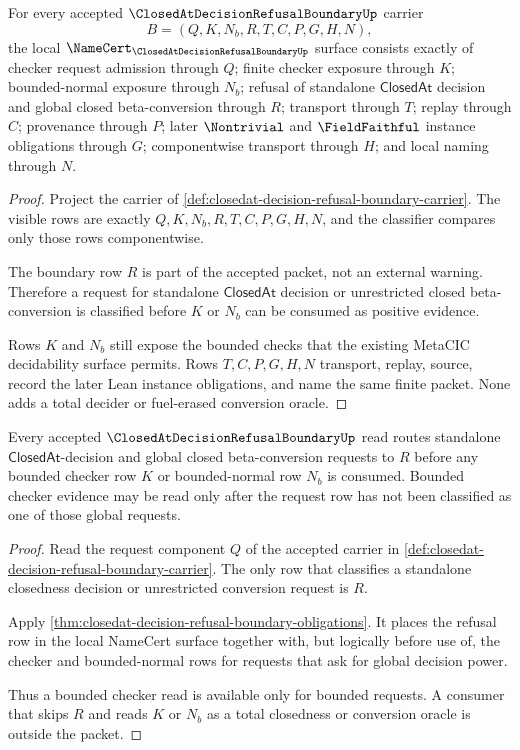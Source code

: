 \begin{theorem}
\label{thm:closedat-decision-refusal-boundary-obligations}
For every accepted $\ClosedAtDecisionRefusalBoundaryUp$ carrier
$$
B=(Q,K,N_b,R,T,C,P,G,H,N),
$$
the local $\NameCert_{\ClosedAtDecisionRefusalBoundaryUp}$ surface consists exactly of checker request admission through $Q$; finite checker exposure through $K$; bounded-normal exposure through $N_b$; refusal of standalone $\mathsf{ClosedAt}$ decision and global closed beta-conversion through $R$; transport through $T$; replay through $C$; provenance through $P$; later $\Nontrivial$ and $\FieldFaithful$ instance obligations through $G$; componentwise transport through $H$; and local naming through $N$.
\end{theorem}
\begin{proof}
Project the carrier of \autoref{def:closedat-decision-refusal-boundary-carrier}. The visible rows are exactly $Q,K,N_b,R,T,C,P,G,H,N$, and the classifier compares only those rows componentwise.

The boundary row $R$ is part of the accepted packet, not an external warning. Therefore a request for standalone $\mathsf{ClosedAt}$ decision or unrestricted closed beta-conversion is classified before $K$ or $N_b$ can be consumed as positive evidence.

Rows $K$ and $N_b$ still expose the bounded checks that the existing MetaCIC decidability surface permits. Rows $T,C,P,G,H,N$ transport, replay, source, record the later Lean instance obligations, and name the same finite packet. None adds a total decider or fuel-erased conversion oracle.
\end{proof}

\begin{theorem}
\label{thm:closedat-decision-refusal-boundary-refusal-first}
Every accepted $\ClosedAtDecisionRefusalBoundaryUp$ read routes standalone $\mathsf{ClosedAt}$-decision and global closed beta-conversion requests to $R$ before any bounded checker row $K$ or bounded-normal row $N_b$ is consumed. Bounded checker evidence may be read only after the request row has not been classified as one of those global requests.
\end{theorem}
\begin{proof}
Read the request component $Q$ of the accepted carrier in \autoref{def:closedat-decision-refusal-boundary-carrier}. The only row that classifies a standalone closedness decision or unrestricted conversion request is $R$.

Apply \autoref{thm:closedat-decision-refusal-boundary-obligations}. It places the refusal row in the local NameCert surface together with, but logically before use of, the checker and bounded-normal rows for requests that ask for global decision power.

Thus a bounded checker read is available only for bounded requests. A consumer that skips $R$ and reads $K$ or $N_b$ as a total closedness or conversion oracle is outside the packet.
\end{proof}

